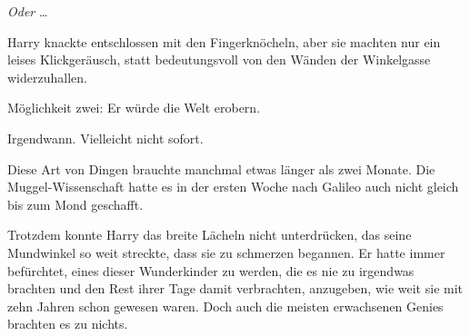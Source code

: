 \emph{Oder} …

Harry knackte entschlossen mit den Fingerknöcheln, aber sie machten nur ein leises Klickgeräusch, statt bedeutungsvoll von den Wänden der Winkelgasse widerzuhallen.

Möglichkeit zwei: Er würde die Welt erobern.

Irgendwann. Vielleicht nicht sofort.

Diese Art von Dingen brauchte manchmal etwas länger als zwei Monate. Die Muggel-Wissenschaft hatte es in der ersten Woche nach Galileo auch nicht gleich bis zum Mond geschafft.

Trotzdem konnte Harry das breite Lächeln nicht unterdrücken, das seine Mundwinkel so weit streckte, dass sie zu schmerzen begannen.
Er hatte immer befürchtet, eines dieser Wunderkinder zu werden, die es nie zu irgendwas brachten und den Rest ihrer Tage damit verbrachten, anzugeben, wie weit sie mit zehn Jahren schon gewesen waren. Doch auch die meisten erwachsenen Genies brachten es zu nichts.

